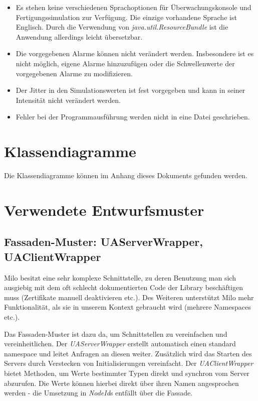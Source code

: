 \documentclass[parskip=full]{scrartcl}
\begin{document}
\begin{itemize}
    \item Es stehen keine verschiedenen Sprachoptionen f\"ur \"Uberwachungskonsole und Fertigungssimulation zur Verf\"ugung.
    Die einzige vorhandene Sprache ist Englisch. Durch die Verwendung von \emph{java.util.ResourceBundle} ist die Anwendung allerdings leicht übersetzbar.
    \item Die vorgegebenen Alarme k\"onnen nicht ver\"andert werden. Insbesondere ist es nicht m\"oglich, eigene Alarme hinzuzuf\"ugen
    oder die Schwellenwerte der vorgegebenen Alarme zu modifizieren.
    \item Der Jitter in den Simulationswerten ist fest vorgegeben und kann in seiner Intensit\"at nicht ver\"andert werden.
    \item Fehler bei der Programmausf\"uhrung werden nicht in eine Datei geschrieben.
\end{itemize}

\section{Klassendiagramme}
Die Klassendiagramme können im Anhang dieses Dokuments gefunden werden.

\pagebreak
\section{Verwendete Entwurfsmuster}
\subsection{Fassaden-Muster: UAServerWrapper, UAClientWrapper}
Milo besitzt eine sehr komplexe Schnittstelle, zu deren Benutzung man sich ausgiebig mit dem oft schlecht dokumentierten Code
der Library beschäftigen muss (Zertifikate manuell deaktivieren etc.). Des Weiteren unterstützt Milo mehr Funktionalität,
als sie in unserem Kontext gebraucht wird (mehrere Namespaces etc.).

Das Fassaden-Muster ist dazu da, um Schnittstellen zu vereinfachen und vereinheitlichen.
Der \emph{UAServerWrapper} erstellt automatisch einen standard namespace und leitet Anfragen an
diesen weiter. Zusätzlich wird das Starten des Servers durch Verstecken von Initialisierungen vereinfacht. Der \emph{UAClientWrapper}
bietet Methoden, um Werte bestimmter Typen direkt und synchron vom Server abzurufen. Die Werte können hierbei direkt über ihren
Namen angesprochen werden - die Umsetzung in \emph{NodeId}s entfällt über die Fassade.
\end{document}
